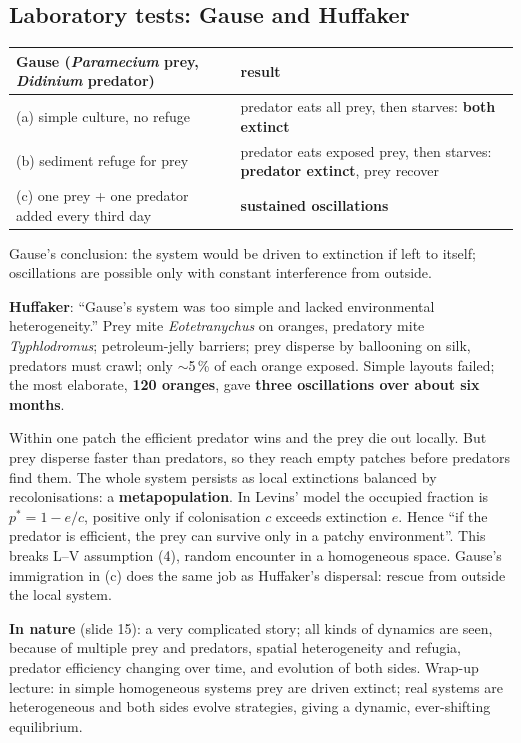 \subsection{Laboratory tests: Gause and Huffaker}
\begin{center}\small
\begin{tabularx}{\textwidth}{lX}
\toprule
Gause (\emph{Paramecium} prey, \emph{Didinium} predator) & result\\\midrule
(a) simple culture, no refuge & predator eats all prey, then starves: \textbf{both extinct}\\
(b) sediment refuge for prey & predator eats exposed prey, then starves: \textbf{predator extinct}, prey recover\\
(c) one prey + one predator added every third day & \textbf{sustained oscillations}\\\bottomrule
\end{tabularx}
\end{center}
Gause's conclusion: the system would be driven to extinction if left to itself; oscillations are possible only with
constant interference from outside.

\textbf{Huffaker}: ``Gause's system was too simple and lacked environmental heterogeneity.'' Prey mite
\emph{Eotetranychus} on oranges, predatory mite \emph{Typhlodromus}; petroleum-jelly barriers; prey disperse by
ballooning on silk, predators must crawl; only $\sim$5\,\% of each orange exposed. Simple layouts failed; the most
elaborate, \textbf{120 oranges}, gave \textbf{three oscillations over about six months}.

\begin{chain}
Within one patch the efficient predator wins and the prey die out locally. But prey disperse faster than
predators, so they reach empty patches before predators find them. The whole system persists as local extinctions
balanced by recolonisations: a \textbf{metapopulation}. In Levins' model the occupied fraction is $p^*=1-e/c$, positive
only if colonisation $c$ exceeds extinction $e$. Hence ``if the predator is efficient, the prey can survive only in a
patchy environment''. This breaks L--V assumption (4), random encounter in a homogeneous space. Gause's immigration
in (c) does the same job as Huffaker's dispersal: rescue from outside the local system.
\end{chain}

\textbf{In nature} (slide 15): a very complicated story; all kinds of dynamics are seen, because of multiple prey and
predators, spatial heterogeneity and refugia, predator efficiency changing over time, and evolution of both sides.
Wrap-up lecture: in simple homogeneous systems prey are driven extinct; real systems are heterogeneous and both sides
evolve strategies, giving a dynamic, ever-shifting equilibrium.

